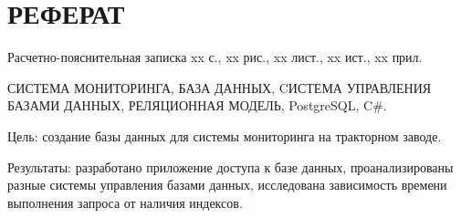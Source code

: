 \chapter*{РЕФЕРАТ}

Расчетно-пояснительная записка xx с., xx рис., xx лист., xx ист., xx прил.

СИСТЕМА МОНИТОРИНГА, БАЗА ДАННЫХ, CИСТЕМА УПРАВЛЕНИЯ БАЗАМИ ДАННЫХ, РЕЛЯЦИОННАЯ МОДЕЛЬ, PostgreSQL, C\#.

Цель: создание базы данных для системы мониторинга на тракторном заводе.

Результаты: разработано приложение доступа к базе данных, проанализированы разные системы управления базами данных, исследована зависимость времени выполнения запроса от наличия индексов.
